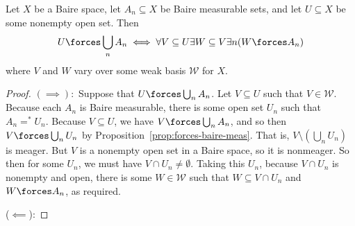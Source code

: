 \documentclass[10pt]{article}
\begin{document}
\begin{proposition}\label{prop:weak-basis-forces}
    Let $X$ be a Baire space, let $A_n \subseteq X$ be Baire measurable sets, and let $U \subseteq X$ be some nonempty open set.
    Then
    \[
        U \forces \bigcup_n A_n \iff \forall V \subseteq U \exists W \subseteq V \exists n (W \forces A_n)
    \]
    where $V$ and $W$ vary over some weak basis $\mathcal{W}$ for $X$.
\end{proposition}
\begin{proof}
    $(\implies):$ Suppose that $U \forces \bigcup_n A_n$.
    Let $V \subseteq U$ such that $V \in \mathcal{W}$.
    Because each $A_n$ is Baire measurable, there is some open set $U_n$ such that $A_n =^* U_n$.
    Because $V \subseteq U$, we have $V \forces \bigcup_n A_n$, and so then $V \forces \bigcup_n U_n$ by Proposition~\ref{prop:forces-baire-meas}.
    That is, $V \setminus (\bigcup_n U_n)$ is meager.
    But $V$ is a nonempty open set in a Baire space, so it is nonmeager.
    So then for some $U_n$, we must have $V \cap U_n \neq \emptyset$.
    Taking this $U_n$, because $V \cap U_n$ is nonempty and open, there is some $W \in \mathcal{W}$ such that $W \subseteq V \cap U_n$ and $W \forces A_n$, as required.

    ($\impliedby$): 
\end{proof}
\end{document}
